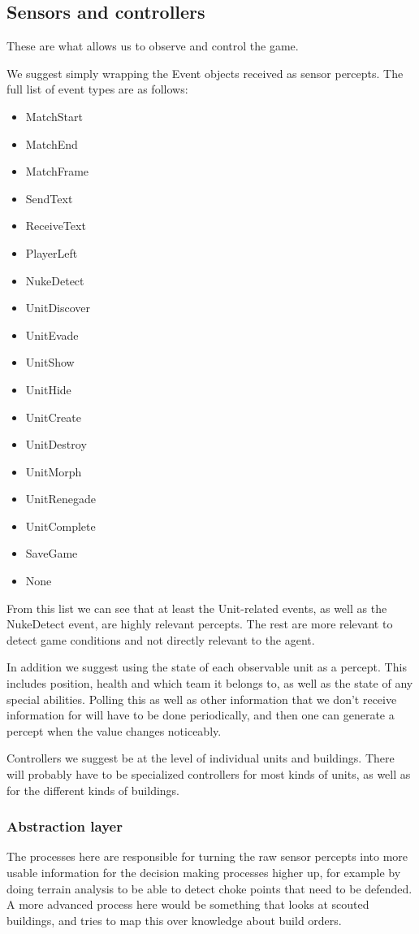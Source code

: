 \subsection{Sensors and controllers}
These are what allows us to observe and control the game.

We suggest simply wrapping the Event objects received as sensor percepts. The
full list of event types are as follows:
\begin{itemize}
    \item MatchStart
    \item MatchEnd
    \item MatchFrame
    \item SendText
    \item ReceiveText
    \item PlayerLeft
    \item NukeDetect
    \item UnitDiscover
    \item UnitEvade
    \item UnitShow
    \item UnitHide
    \item UnitCreate
    \item UnitDestroy
    \item UnitMorph
    \item UnitRenegade
    \item UnitComplete
    \item SaveGame
    \item None 
\end{itemize}
From this list we can see that at least the Unit-related events, as well as the
NukeDetect event, are highly relevant percepts. The rest are more relevant to
detect game conditions and not directly relevant to the agent.

In addition we suggest using the state of each observable unit as a percept.
This includes position, health and which team it belongs to, as well as the
state of any special abilities. Polling this as well as other information that
we don't receive information for will have to be done periodically, and then
one can generate a percept when the value changes noticeably.

Controllers we suggest be at the level of individual units and buildings. There
will probably have to be specialized controllers for most kinds of units, as
well as for the different kinds of buildings.

\subsubsection{Abstraction layer}
The processes here are responsible for turning the raw sensor percepts into
more usable information for the decision making processes higher up, for
example by doing terrain analysis to be able to detect choke points that need
to be defended. A more advanced process here would be something that looks at
scouted buildings, and tries to map this over knowledge about build orders.


